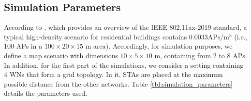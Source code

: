 \documentclass[preprint,12pt]{elsarticle}
\begin{document}
	\subsection{Simulation Parameters}
	\label{section:simulation_parameters}
	According to \cite{bellalta2016ax}, which provides an overview of the IEEE 802.11ax-2019 standard, a typical high-density scenario for residential buildings contains $0.0033 \text{APs}/\text{m}^3$ (i.e., 100 APs in a $100 \times 20 \times 15$ m area). Accordingly, for simulation purposes, we define a map scenario with dimensions $10\times5\times10$ m, containing from 2 to 8 APs. In addition, for the first part of the simulations, we consider a setting containing 4 WNs that form a grid topology. In it, STAs are placed at the maximum possible distance from the other networks. Table \ref{tbl:simulation_parameters} details the parameters used.	
	\begin{table}[h!]
		\centering
		\caption{Simulation parameters}
		\label{tbl:simulation_parameters}
	\end{table}
	
\end{document}
